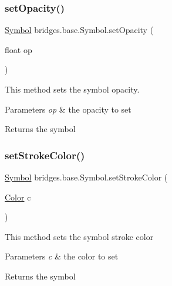 \subsubsection{\texorpdfstring{set\+Opacity()}{setOpacity()}}
{\footnotesize\ttfamily \hyperlink{classbridges_1_1base_1_1_symbol}{Symbol} bridges.\+base.\+Symbol.\+set\+Opacity (\begin{DoxyParamCaption}\item[{float}]{op }\end{DoxyParamCaption})}



This method sets the symbol opacity. 


\begin{DoxyParams}{Parameters}
{\em op} & the opacity to set \\
\hline
\end{DoxyParams}
\begin{DoxyReturn}{Returns}
the symbol 
\end{DoxyReturn}
\mbox{\label{classbridges_1_1base_1_1_symbol_a10abfbf4651ffdc630121da84e23b116}} 
\subsubsection{\texorpdfstring{set\+Stroke\+Color()}{setStrokeColor()}\hspace{0.1cm}{\footnotesize\ttfamily [1/2]}}
{\footnotesize\ttfamily \hyperlink{classbridges_1_1base_1_1_symbol}{Symbol} bridges.\+base.\+Symbol.\+set\+Stroke\+Color (\begin{DoxyParamCaption}\item[{\hyperlink{classbridges_1_1base_1_1_color}{Color}}]{c }\end{DoxyParamCaption})}

This method sets the symbol stroke color


\begin{DoxyParams}{Parameters}
{\em c} & the color to set \\
\hline
\end{DoxyParams}
\begin{DoxyReturn}{Returns}
the symbol 
\end{DoxyReturn}
\mbox{\label{classbridges_1_1base_1_1_symbol_ae9aa7d4e9b497875017a9b6e0eaab181}} 

